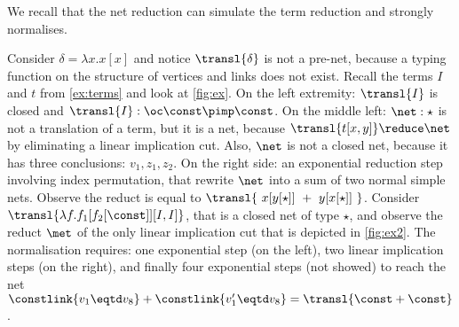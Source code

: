 We recall that the net reduction can simulate the term reduction and strongly 
normalises.

\begin{example}\label{ex:nets}
Consider $\delta = \lambda x. x [x]$
and notice $\transl{\delta}$ is not a pre-net,
because a typing function on the structure of vertices and links does not exist.
Recall the terms $I$ and $t$ from \autoref{ex:terms}
and look at \autoref{fig:ex}.
On the left extremity:
  $\transl{I}$ is closed and $\transl{I}:\oc \const \pimp \const$.
On the middle left: $\net : \star$ is not a translation of a term,
but it is a net,
  because $\transl{t[x,y]} \reduce \net$ by eliminating a linear implication 
cut.
Also, $\net$ is not a closed net,
 because it has three conclusions: $v_1, z_1, z_2$.
On the right side: an exponential reduction step involving index permutation,
that rewrite $\net$ into a sum of two normal simple nets.
Observe the reduct is equal to
  $\transl{\ x[y[\star]]\ +\ y[x[\star]]\ }$.
Consider $\transl{\lambda f. f_1 [ f_2 [\const]][I,I] }$,
that is a closed net of type $\star$,
and observe the reduct $\met$ of the only linear implication cut
that is depicted in \autoref{fig:ex2}.
The normalisation requires: one exponential step (on the left),
two linear implication steps (on the right),
and finally four exponential steps (not showed) to reach the net
$
  \constlink{v_1 \eqtd v_8} +
  \constlink{v'_1 \eqtd v_8}
  =
 \transl{\const+\const}$.
\end{example}


